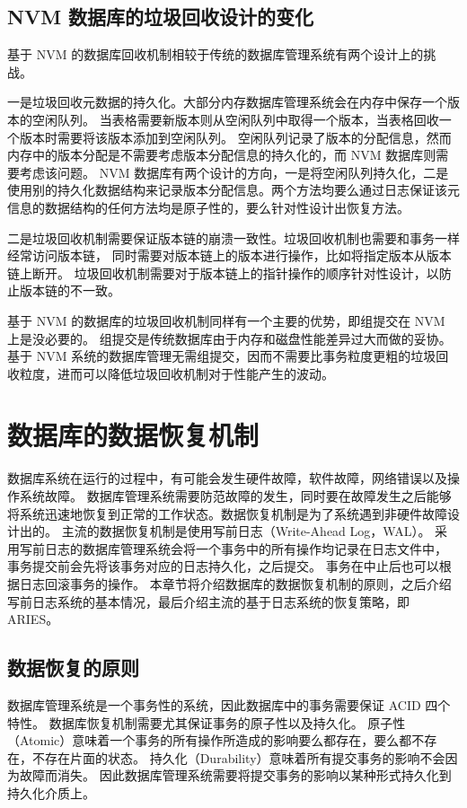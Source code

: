 \subsection{NVM 数据库的垃圾回收设计的变化}

基于 NVM 的数据库回收机制相较于传统的数据库管理系统有两个设计上的挑战。

一是垃圾回收元数据的持久化。大部分内存数据库管理系统会在内存中保存一个版本的空闲队列。
当表格需要新版本则从空闲队列中取得一个版本，当表格回收一个版本时需要将该版本添加到空闲队列。
空闲队列记录了版本的分配信息，然而内存中的版本分配是不需要考虑版本分配信息的持久化的，而 NVM 数据库则需要考虑该问题。
NVM 数据库有两个设计的方向，一是将空闲队列持久化，二是使用别的持久化数据结构来记录版本分配信息。两个方法均要么通过日志保证该元信息的数据结构的任何方法均是原子性的，要么针对性设计出恢复方法。

二是垃圾回收机制需要保证版本链的崩溃一致性。垃圾回收机制也需要和事务一样经常访问版本链，
同时需要对版本链上的版本进行操作，比如将指定版本从版本链上断开。
垃圾回收机制需要对于版本链上的指针操作的顺序针对性设计，以防止版本链的不一致。

基于 NVM 的数据库的垃圾回收机制同样有一个主要的优势，即组提交在 NVM 上是没必要的。
组提交是传统数据库由于内存和磁盘性能差异过大而做的妥协。基于 NVM 系统的数据库管理无需组提交，因而不需要比事务粒度更粗的垃圾回收粒度，进而可以降低垃圾回收机制对于性能产生的波动。


\section{数据库的数据恢复机制}

数据库系统在运行的过程中，有可能会发生硬件故障，软件故障，网络错误以及操作系统故障。
数据库管理系统需要防范故障的发生，同时要在故障发生之后能够将系统迅速地恢复到正常的工作状态。数据恢复机制是为了系统遇到非硬件故障设计出的。
主流的数据恢复机制是使用写前日志（Write-Ahead Log，WAL）。
采用写前日志的数据库管理系统会将一个事务中的所有操作均记录在日志文件中，
事务提交前会先将该事务对应的日志持久化，之后提交。
事务在中止后也可以根据日志回滚事务的操作。
本章节将介绍数据库的数据恢复机制的原则，之后介绍写前日志系统的基本情况，最后介绍主流的基于日志系统的恢复策略，即 ARIES。

\subsection{数据恢复的原则}

数据库管理系统是一个事务性的系统，因此数据库中的事务需要保证 ACID 四个特性。
数据库恢复机制需要尤其保证事务的原子性以及持久化。
原子性（Atomic）意味着一个事务的所有操作所造成的影响要么都存在，要么都不存在，不存在片面的状态。
持久化（Durability）意味着所有提交事务的影响不会因为故障而消失。
因此数据库管理系统需要将提交事务的影响以某种形式持久化到持久化介质上。

